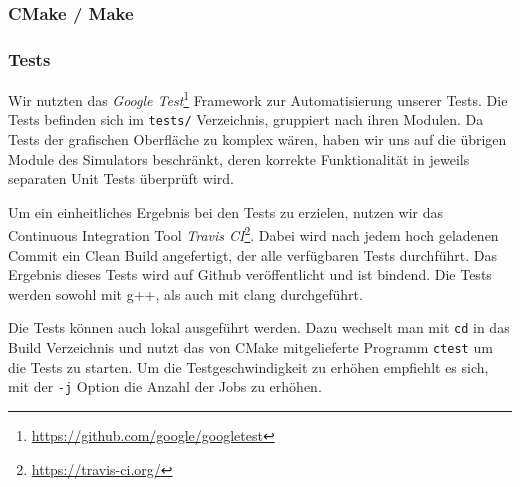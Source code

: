 \subsubsection{CMake / Make}

\subsubsection{Tests}

Wir nutzten das \textit{Google Test}\footnote{\url{https://github.com/google/googletest}} Framework
zur Automatisierung unserer Tests. Die Tests befinden sich im \texttt{tests/} Verzeichnis, gruppiert
nach ihren Modulen. Da Tests der grafischen Oberfläche zu komplex wären, haben wir uns auf die übrigen
Module des Simulators beschränkt, deren korrekte Funktionalität in jeweils separaten Unit Tests
überprüft wird.

Um ein einheitliches Ergebnis bei den Tests zu erzielen, nutzen wir das Continuous Integration Tool
\textit{Travis CI}\footnote{\url{https://travis-ci.org/}}. Dabei wird nach jedem hoch geladenen
Commit ein Clean Build angefertigt, der alle verfügbaren Tests durchführt. Das Ergebnis dieses Tests
wird auf Github veröffentlicht und ist bindend. Die Tests werden sowohl mit g++, als auch mit clang
durchgeführt.

Die Tests können auch lokal ausgeführt werden. Dazu wechselt man mit \texttt{cd} in das Build
Verzeichnis und nutzt das von CMake mitgelieferte Programm \texttt{ctest} um die Tests zu starten.
Um die Testgeschwindigkeit zu erhöhen empfiehlt es sich, mit der \texttt{-j} Option die Anzahl
der Jobs zu erhöhen. 


